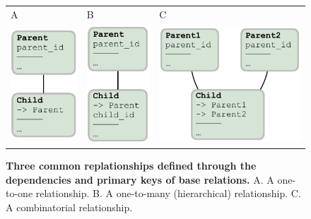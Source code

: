 \begin{figure}[h]
\begin{center}
\begin{tabular}{p{}p{}p{}}
{\sf \large A} &
{\sf \large B} &
{\sf \large C} \\
\vspace{0pt} \includegraphics{./figures/depA.pdf} &
\vspace{0pt} \includegraphics{./figures/depB.pdf} &
\vspace{0pt} \includegraphics{./figures/depC.pdf}
\end{tabular}
\end{center}
\caption{
{\bf Three common replationships defined through the dependencies and primary keys of base relations.}
{\sf A.} A one-to-one relationship.
{\sf B.} A one-to-many (hierarchical) relationship.
{\sf C.} A combinatorial relationship. 
}
\label{dep}
\end{figure}
